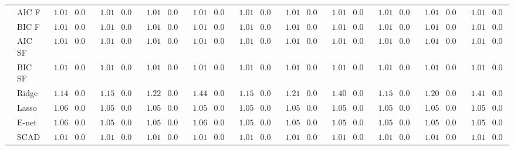 \begin{tabular}{ll|ll|llllll|llllll|llllll}
 & AIC F  & $\phantom{0}1.01$ & $0.04$ & $\phantom{0}1.01$ & $0.04$ & $\phantom{0}1.01$ & $0.04$ & $\phantom{0}1.01$ & $0.04$ & $\phantom{0}1.01$ & $0.04$ & $\phantom{0}1.01$ & $0.04$ & $\phantom{0}1.01$ & $0.04$ & $\phantom{0}1.01$ & $0.04$ & $\phantom{0}1.01$ & $0.04$ & $\phantom{0}1.01$ & $0.04$ \\
 & BIC F  & $\phantom{0}1.01$ & $0.04$ & $\phantom{0}1.01$ & $0.04$ & $\phantom{0}1.01$ & $0.04$ & $\phantom{0}1.01$ & $0.04$ & $\phantom{0}1.01$ & $0.04$ & $\phantom{0}1.01$ & $0.04$ & $\phantom{0}1.01$ & $0.04$ & $\phantom{0}1.01$ & $0.04$ & $\phantom{0}1.01$ & $0.04$ & $\phantom{0}1.01$ & $0.04$ \\
 & AIC SF  & $\phantom{0}1.01$ & $0.04$ & $\phantom{0}1.01$ & $0.04$ & $\phantom{0}1.01$ & $0.04$ & $\phantom{0}1.01$ & $0.04$ & $\phantom{0}1.01$ & $0.04$ & $\phantom{0}1.01$ & $0.04$ & $\phantom{0}1.01$ & $0.04$ & $\phantom{0}1.01$ & $0.04$ & $\phantom{0}1.01$ & $0.04$ & $\phantom{0}1.01$ & $0.04$ \\
 & BIC SF  & $\phantom{0}1.01$ & $0.04$ & $\phantom{0}1.01$ & $0.04$ & $\phantom{0}1.01$ & $0.04$ & $\phantom{0}1.01$ & $0.04$ & $\phantom{0}1.01$ & $0.04$ & $\phantom{0}1.01$ & $0.04$ & $\phantom{0}1.01$ & $0.04$ & $\phantom{0}1.01$ & $0.04$ & $\phantom{0}1.01$ & $0.04$ & $\phantom{0}1.01$ & $0.04$ \\
 & Ridge  & $\phantom{0}1.14$ & $0.06$ & $\phantom{0}1.15$ & $0.06$ & $\phantom{0}1.22$ & $0.06$ & $\phantom{0}1.44$ & $0.08$ & $\phantom{0}1.15$ & $0.06$ & $\phantom{0}1.21$ & $0.07$ & $\phantom{0}1.40$ & $0.06$ & $\phantom{0}1.15$ & $0.06$ & $\phantom{0}1.20$ & $0.06$ & $\phantom{0}1.41$ & $0.07$ \\
 & Lasso  & $\phantom{0}1.06$ & $0.05$ & $\phantom{0}1.05$ & $0.05$ & $\phantom{0}1.05$ & $0.05$ & $\phantom{0}1.05$ & $0.05$ & $\phantom{0}1.05$ & $0.05$ & $\phantom{0}1.05$ & $0.05$ & $\phantom{0}1.05$ & $0.05$ & $\phantom{0}1.05$ & $0.05$ & $\phantom{0}1.05$ & $0.05$ & $\phantom{0}1.05$ & $0.05$ \\
 & E-net  & $\phantom{0}1.06$ & $0.05$ & $\phantom{0}1.05$ & $0.05$ & $\phantom{0}1.05$ & $0.05$ & $\phantom{0}1.06$ & $0.05$ & $\phantom{0}1.05$ & $0.05$ & $\phantom{0}1.05$ & $0.05$ & $\phantom{0}1.05$ & $0.05$ & $\phantom{0}1.05$ & $0.05$ & $\phantom{0}1.05$ & $0.05$ & $\phantom{0}1.05$ & $0.05$ \\
 & SCAD  & $\phantom{0}1.01$ & $0.04$ & $\phantom{0}1.01$ & $0.04$ & $\phantom{0}1.01$ & $0.04$ & $\phantom{0}1.01$ & $0.04$ & $\phantom{0}1.01$ & $0.04$ & $\phantom{0}1.01$ & $0.04$ & $\phantom{0}1.01$ & $0.04$ & $\phantom{0}1.01$ & $0.04$ & $\phantom{0}1.01$ & $0.04$ & $\phantom{0}1.01$ & $0.04$ \\

\end{tabular}
